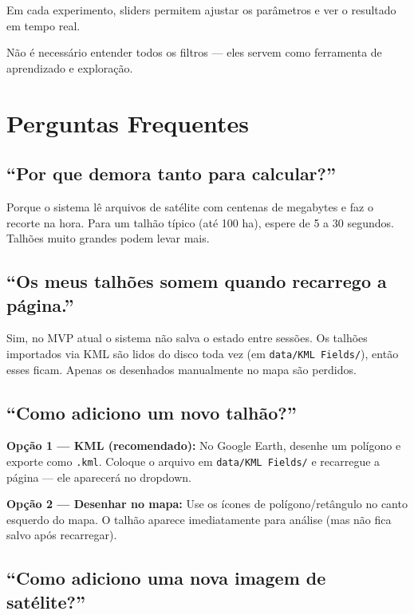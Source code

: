 \documentclass[11pt, a4paper]{article}
\begin{document}
Em cada experimento, sliders permitem ajustar os parâmetros e ver o resultado em tempo real.

\begin{infobox}
Não é necessário entender todos os filtros --- eles servem como ferramenta de aprendizado e exploração.
\end{infobox}

\section{Perguntas Frequentes}

\subsection*{``Por que demora tanto para calcular?''}

Porque o sistema lê arquivos de satélite com centenas de megabytes e faz o recorte na hora. Para um talhão típico (até 100 ha), espere de 5 a 30 segundos. Talhões muito grandes podem levar mais.

\subsection*{``Os meus talhões somem quando recarrego a página.''}

Sim, no MVP atual o sistema não salva o estado entre sessões. Os talhões importados via KML são lidos do disco toda vez (em \texttt{data/KML Fields/}), então esses ficam. Apenas os desenhados manualmente no mapa são perdidos.

\subsection*{``Como adiciono um novo talhão?''}

\textbf{Opção 1 --- KML (recomendado):} No Google Earth, desenhe um polígono e exporte como \texttt{.kml}. Coloque o arquivo em \texttt{data/KML Fields/} e recarregue a página --- ele aparecerá no dropdown.

\textbf{Opção 2 --- Desenhar no mapa:} Use os ícones de polígono/retângulo no canto esquerdo do mapa. O talhão aparece imediatamente para análise (mas não fica salvo após recarregar).

\subsection*{``Como adiciono uma nova imagem de satélite?''}
\end{document}
